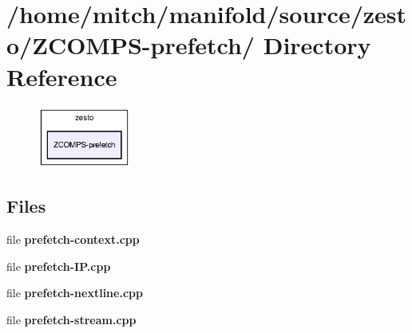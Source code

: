 \section{/home/mitch/manifold/source/zesto/ZCOMPS-prefetch/ Directory Reference}
\label{dir_97be7531d0c691826a7b0da01a08231e}


\nopagebreak
\begin{figure}[H]
\begin{center}
\leavevmode
\includegraphics[width=86pt]{dir_97be7531d0c691826a7b0da01a08231e_dep}
\end{center}
\end{figure}
\subsection*{Files}
\begin{CompactItemize}
\item 
file {\bf prefetch-context.cpp}
\item 
file {\bf prefetch-IP.cpp}
\item 
file {\bf prefetch-nextline.cpp}
\item 
file {\bf prefetch-stream.cpp}
\end{CompactItemize}
